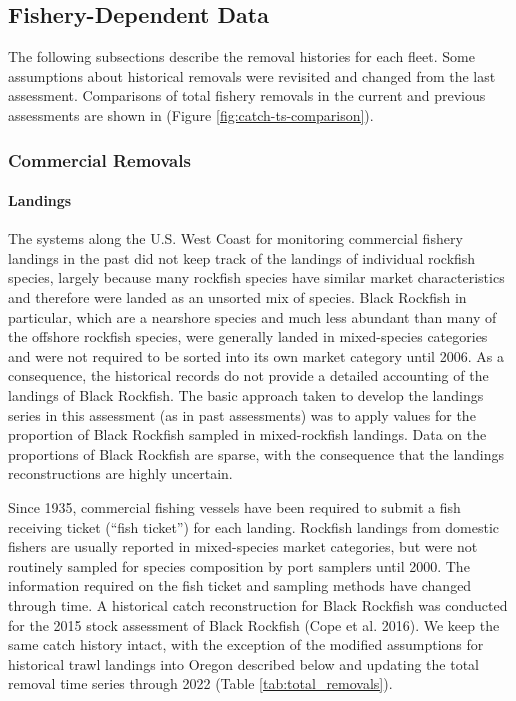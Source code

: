 \documentclass[11pt,
  letterpaper,
]{article}
\begin{document}
\hypertarget{fishery-dependent-data}{%
\subsection{Fishery-Dependent Data}\label{fishery-dependent-data}}

The following subsections describe the removal histories for each fleet. Some assumptions about historical removals were revisited and changed from the last assessment. Comparisons of total fishery removals in the current and previous assessments are shown in (Figure \ref{fig:catch-ts-comparison}).

\hypertarget{commercial-removals}{%
\subsubsection{Commercial Removals}\label{commercial-removals}}

\hypertarget{com-landings}{%
\paragraph{Landings}\label{com-landings}}

The systems along the U.S. West Coast for monitoring commercial fishery landings in the past did not keep track of the landings of individual rockfish species, largely because many rockfish species have similar market characteristics and therefore were landed as an unsorted mix of species. Black Rockfish in particular, which are a nearshore species and much less abundant than many of the offshore rockfish species, were generally landed in mixed-species categories and were not required to be sorted into its own market category until 2006. As a consequence, the historical records do not provide a detailed accounting of the landings of Black Rockfish. The basic approach taken to develop the landings series in this assessment (as in past assessments) was to apply values for the proportion of Black Rockfish sampled in mixed-rockfish landings. Data on the proportions of Black Rockfish are sparse, with the consequence that the landings reconstructions are highly uncertain.

Since 1935, commercial fishing vessels have been required to submit a fish receiving ticket (``fish ticket'') for each landing. Rockfish landings from domestic fishers are usually reported in mixed-species market categories, but were not routinely sampled for species composition by port samplers until 2000. The information required on the fish ticket and sampling methods have changed through time. A historical catch reconstruction for Black Rockfish was conducted for the 2015 stock assessment of Black Rockfish (Cope et al. 2016). We keep the same catch history intact, with the exception of the modified assumptions for historical trawl landings into Oregon described below and updating the total removal time series through 2022 (Table \ref{tab:total_removals}).
\end{document}
